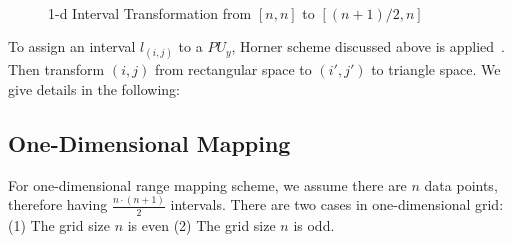 \documentclass[AMA,LATO1COL]{WileyNJD-v2}
\begin{document}
\begin{figure}[h]
\centering
{}
~~
\caption{1-d Interval Transformation from $[n,n]$ to $[(n+1)/2,n]$}\label{modelBF}
\end{figure}

To assign an interval $l_(i,j)$ to a $PU_y$, Horner scheme discussed above is applied~\cite{horner}. Then transform $(i,j)$ from rectangular space to $(i',j')$  to triangle space. We give details in the following:

\subsection{One-Dimensional Mapping}
For one-dimensional range mapping scheme, we assume there are $n$ data points, therefore having ${\frac{n \cdot (n+1)}{2}}$ intervals. There are two cases in one-dimensional grid: (1) The grid size $n$ is even (2) The grid size $n$ is odd. \\
\end{document}
